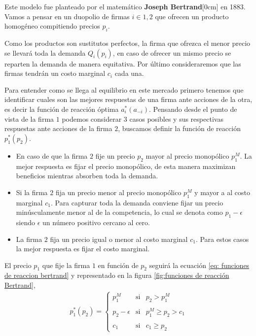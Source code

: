 Este modelo fue planteado por el matemático \textbf{Joseph Bertrand}[0cm] en 1883. Vamos a pensar en un duopolio de firmas $i\in 1,2$ que ofrecen un producto homogéneo compitiendo precios $p_i$. 

Como los productos son sustitutos perfectos, la firma que ofrezca el menor precio se llevará toda la demanda $Q_i(p_i)$, en caso de ofrecer un mismo precio se reparten la demanda de manera equitativa. Por último consideraremos que las firmas tendrán un costo marginal $c_i$ cada una. 

Para entender como se llega al equilibrio en este mercado primero tenemos que identificar cuales son las mejores respuestas de una firma ante acciones de la otra, es decir la función de reacción óptima $a^*_i(a_{-i})$. Pensando desde el punto de vista de la firma $1$ podemos considerar 3 casos posibles y sus respectivas respuestas ante acciones de la firma $2$, buscamos definir la función de reacción $p^*_1(p_2)$.

\begin{itemize}
    \item En caso de que la firma $2$ fije un precio $p_2$ mayor al precio monopólico $p_1^M$. La mejor respuesta es fijar el precio monopólico, de esta manera maximizan beneficios mientras absorben toda la demanda.
    \item Si la firma $2$ fija un precio menor al precio monopólico $p_1^M$ y mayor a al costo marginal $c_1$. Para capturar toda la demanda conviene fijar un precio minúsculamente menor al de la competencia, lo cual se denota como $p_1-\epsilon$ siendo $\epsilon$ un número positivo cercano al cero.
    \item La firma $2$ fija un precio igual o menor al costo marginal $c_1$. Para estos casos la mejor respuesta es fijar el costo marginal.
\end{itemize}

El precio $p_1$ que fije la firma $1$ en función de $p_2$ seguirá la ecuación \ref{eq: funciones de reaccion bertrand} y representado en la figura \ref{fig:funciones de reacción Bertrand},
\begin{align}
    p^*_1(p_2)= \left\{ \begin{array}{lcc} p_1^M & \text{si} &  p_2> p_1^M  \\ \\ p_2-\epsilon & \text{si} & p_1^M \geq p_2>c_1 \\ \\ c_1 & \text{si} & c_1 \geq p_2  \end{array} \right. \label{eq: funciones de reaccion bertrand}
\end{align}

